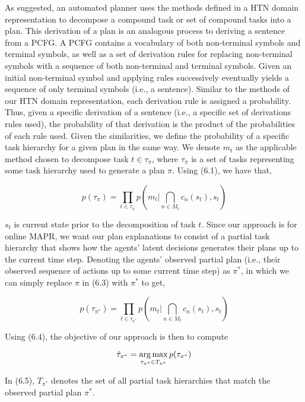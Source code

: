 As suggested, an automated planner uses the methods defined in a HTN domain representation to decompose a compound task or set of compound tasks into a plan. This derivation of a plan is an analogous process to deriving a sentence from a PCFG. A PCFG contains a vocabulary of both non-terminal symbols and terminal symbols, as well as a set of derivation rules for replacing non-terminal symbols with a sequence of both non-terminal and terminal symbols. Given an initial non-terminal symbol and applying rules successively eventually yields a sequence of only terminal symbols (i.e., a sentence). Similar to the methods of our HTN domain representation, each derivation rule is assigned a probability. Thus, given a specific derivation of a sentence (i.e., a specific set of derivations rules used), the probability of that derivation is the product of the probabilities of each rule used. Given the similarities, we define the probability of a specific task hierarchy for a given plan in the same way. We denote $m_t$ as the applicable method chosen to decompose task $t \in \tau_\pi$, where $\tau_\pi$ is a set of tasks representing some task hierarchy used to generate a plan $\pi$. Using (6.1), we have that,

\begin{equation}
p(\tau_\pi) = \prod_{t \in \tau_\pi} p(m_t | \bigcap_{n \in M_t} c_n(s_t), s_t) 
\end{equation}

$s_t$ is current state prior to the decomposition of task $t$. Since our approach is for online MAPR, we want our plan explanations to consist of a partial task hierarchy that shows how the agents' latent decisions generates their plans up to the current time step. Denoting the agents' observed partial plan (i.e., their observed sequence of actions up to some current time step) as $\pi^*$, in which we can simply replace $\pi$ in (6.3) with $\pi^*$ to get,

\begin{equation}
p(\tau_{\pi^*}) = \prod_{t \in \tau_{\pi^*}} p(m_t | \bigcap_{n \in M_t} c_n(s_t), s_t) 
\end{equation}

Using (6.4), the objective of our approach is then to compute 

\begin{equation}
\hat{\tau}_{\pi^*} = \operatorname*{arg\,max}_{\tau_{\pi^*} \in T_{\pi^*}} p(\tau_{\pi^*})
\end{equation}

In (6.5), $T_{\pi^*}$ denotes the set of all partial task hierarchies that match the observed partial plan $\pi^*$.

